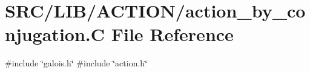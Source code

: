 \hypertarget{action__by__conjugation_8_c}{}\section{S\+R\+C/\+L\+I\+B/\+A\+C\+T\+I\+O\+N/action\+\_\+by\+\_\+conjugation.C File Reference}
\label{action__by__conjugation_8_c}
{\ttfamily \#include \char`\"{}galois.\+h\char`\"{}}\newline
{\ttfamily \#include \char`\"{}action.\+h\char`\"{}}\newline
